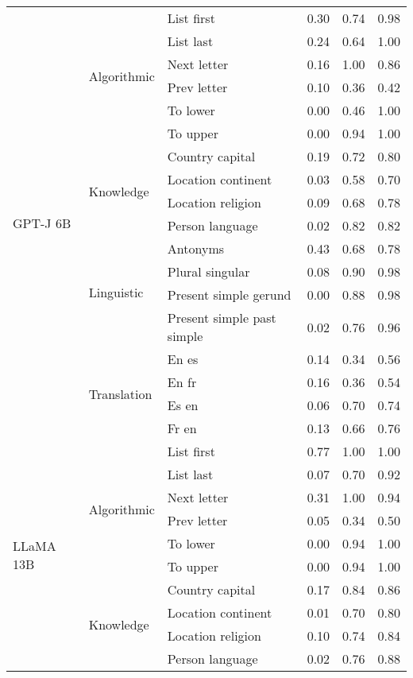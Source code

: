\begin{center}
\begin{longtable}{lllrrr}
\multirow[t]{18}{*}{GPT-J 6B} & \multirow[t]{6}{*}{Algorithmic} & List first & 0.30 & 0.74 & 0.98 \\
 &  & List last & 0.24 & 0.64 & 1.00 \\
 &  & Next letter & 0.16 & 1.00 & 0.86 \\
 &  & Prev letter & 0.10 & 0.36 & 0.42 \\
 &  & To lower & 0.00 & 0.46 & 1.00 \\
 &  & To upper & 0.00 & 0.94 & 1.00 \\
\cline{2-6}
 & \multirow[t]{4}{*}{Knowledge} & Country capital & 0.19 & 0.72 & 0.80 \\
 &  & Location continent & 0.03 & 0.58 & 0.70 \\
 &  & Location religion & 0.09 & 0.68 & 0.78 \\
 &  & Person language & 0.02 & 0.82 & 0.82 \\
\cline{2-6}
 & \multirow[t]{4}{*}{Linguistic} & Antonyms & 0.43 & 0.68 & 0.78 \\
 &  & Plural singular & 0.08 & 0.90 & 0.98 \\
 &  & Present simple gerund & 0.00 & 0.88 & 0.98 \\
 &  & Present simple past simple & 0.02 & 0.76 & 0.96 \\
\cline{2-6}
 & \multirow[t]{4}{*}{Translation} & En es & 0.14 & 0.34 & 0.56 \\
 &  & En fr & 0.16 & 0.36 & 0.54 \\
 &  & Es en & 0.06 & 0.70 & 0.74 \\
 &  & Fr en & 0.13 & 0.66 & 0.76 \\
\cline{1-6} \cline{2-6}
\multirow[t]{18}{*}{LLaMA 13B} & \multirow[t]{6}{*}{Algorithmic} & List first & 0.77 & 1.00 & 1.00 \\
 &  & List last & 0.07 & 0.70 & 0.92 \\
 &  & Next letter & 0.31 & 1.00 & 0.94 \\
 &  & Prev letter & 0.05 & 0.34 & 0.50 \\
 &  & To lower & 0.00 & 0.94 & 1.00 \\
 &  & To upper & 0.00 & 0.94 & 1.00 \\
\cline{2-6}
 & \multirow[t]{4}{*}{Knowledge} & Country capital & 0.17 & 0.84 & 0.86 \\
 &  & Location continent & 0.01 & 0.70 & 0.80 \\
 &  & Location religion & 0.10 & 0.74 & 0.84 \\
 &  & Person language & 0.02 & 0.76 & 0.88 \\

\end{longtable}
\end{center}
